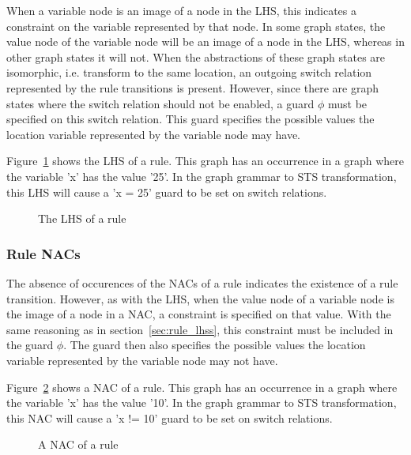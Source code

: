 When a variable node is an image of a node in the LHS, this indicates a constraint on the variable represented by that node. In some graph states, the value node of the variable node will be an image of a node in the LHS, whereas in other graph states it will not. When the abstractions of these graph states are isomorphic, i.e. transform to the same location, an outgoing switch relation represented by the rule transitions is present. However, since there are graph states where the switch relation should not be enabled, a guard $\phi$ must be specified on this switch relation. This guard specifies the possible values the location variable represented by the variable node may have. 

Figure~\ref{fig:lhs_trafo} shows the LHS of a rule. This graph has an occurrence in a graph where the variable 'x' has the value '25'. In the graph grammar to STS transformation, this LHS will cause a 'x = 25' guard to be set on switch relations.

\begin{figure}[ht]
  \begin{center}
    
  \end{center}
  \caption{The LHS of a rule}
  \label{fig:lhs_trafo}
\end{figure}

\subsubsection{Rule NACs}
The absence of occurences of the NACs of a rule indicates the existence of a rule transition. However, as with the LHS, when the value node of a variable node is the image of a node in a NAC, a constraint is specified on that value. With the same reasoning as in section~\ref{sec:rule_lhss}, this constraint must be included in the guard $\phi$. The guard then also specifies the possible values the location variable represented by the variable node may not have.

Figure~\ref{fig:nac_trafo} shows a NAC of a rule. This graph has an occurrence in a graph where the variable 'x' has the value '10'. In the graph grammar to STS transformation, this NAC will cause a 'x != 10' guard to be set on switch relations.

\begin{figure}[ht]
  \begin{center}
    
  \end{center}
  \caption{A NAC of a rule}
  \label{fig:nac_trafo}
\end{figure}

